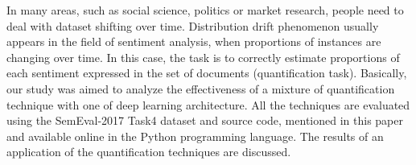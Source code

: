 In many areas, such as social science, politics or market research, people need to deal with dataset shifting over time. Distribution drift phenomenon usually appears in the field of sentiment analysis, when proportions of instances are changing over time. In this case, the task is to correctly estimate proportions of each sentiment expressed in the set of documents (quantification task). Basically, our study was aimed to analyze the effectiveness of a mixture of quantification technique with one of deep learning architecture. All the techniques are evaluated using the SemEval-2017 Task4 dataset and source code, mentioned in this paper and available online in the Python programming language. The results of an application of the quantification techniques are discussed.
